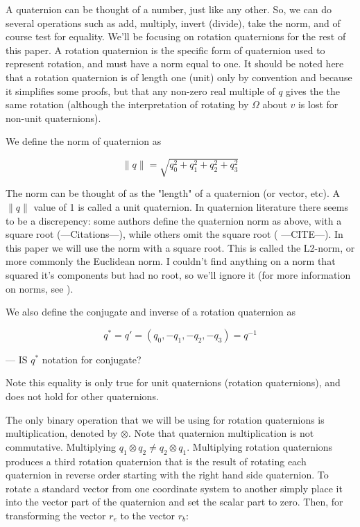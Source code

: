 \documentclass{article}
\numberwithin{equation}{section} %
\begin{document}
A quaternion can be thought of a number, just like any other. So, we can do several operations such as add, multiply, invert (divide), take the norm, and of course test for equality. We'll be focusing on rotation quaternions for the rest of this paper. A rotation quaternion is the specific form of quaternion used to represent rotation, and must have a norm equal to one. It should be noted here that a rotation quaternion is of length one (unit) only by convention and because it simplifies some proofs, but that any non-zero real multiple of $q$ gives the the same rotation (although the interpretation of rotating by $\Omega$ about $v$ is lost for non-unit quaternions).

We define the norm of quaternion as

$$ \lVert q \rVert = \sqrt{q_0^2 + q_1^2 + q_2^2 + q_3^2} $$

The norm can be thought of as the "length" of a quaternion (or vector, etc). A $ \lVert q \rVert $ value of 1 is called a unit quaternion. In quaternion literature there seems to be a discrepency: some authors define the quaternion norm as above, with a square root (---Citations---), while others omit the square root (\cite{shoemake69} ---CITE---). In this paper we will use the norm with a square root. This is called the L2-norm, or more commonly the Euclidean norm. I couldn't find anything on a norm that squared it's components but had no root, so we'll ignore it (for more information on norms, see \cite{malek09}).

We also define the conjugate and inverse of a rotation quaternion as

$$ q^* = q' = \left(q_0, -q_1, -q_2, -q_3 \right) = q^{-1} $$

--- IS $q^*$ notation for conjugate?

Note this equality is only true for unit quaternions (rotation quaternions), and does not hold for other quaternions.

The only binary operation that we will be using for rotation quaternions is multiplication, denoted by $ \otimes$. Note that quaternion multiplication is not commutative. Multiplying $q_1 \otimes q_2 \neq q_2 \otimes q_1 $. Multiplying rotation quaternions produces a third rotation quaternion that is the result of rotating each quaternion in reverse order starting with the right hand side quaternion. To rotate a standard vector from one coordinate system to another simply place it into the vector part of the quaternion and set the scalar part to zero. Then, for transforming the vector $r_e$ to the vector $r_b$:
\end{document}
